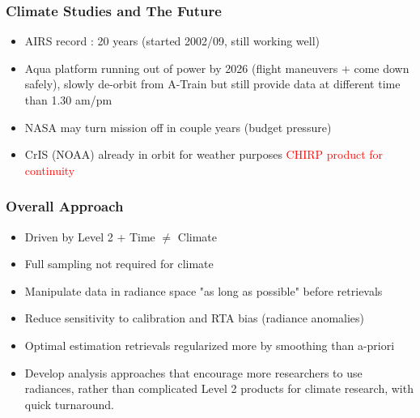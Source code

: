 \documentclass[10pt,t]{beamer}
\begin{document}
\begin{frame}
\frametitle{Climate Studies and The Future}  
\begin{itemize}
  \item AIRS record : 20 years (started 2002/09, still working well)  
  \item Aqua platform running out of power by 2026 (flight maneuvers + come down safely), slowly de-orbit from A-Train
        but still provide data at different time than 1.30 am/pm
  \item NASA may turn mission off in couple years (budget pressure)
  \item CrIS (NOAA) already in orbit for weather purposes \textcolor{red}{CHIRP product for continuity}
\end{itemize}
\end{frame}
\begin{frame}
\frametitle{Overall Approach}  
\begin{itemize}
\item Driven by Level 2 + Time \(\neq\) Climate
\item Full sampling not required for climate
\item Manipulate data in radiance space "as long as possible" before retrievals
\item Reduce sensitivity to calibration and RTA bias (radiance anomalies)
\item Optimal estimation retrievals regularized more by smoothing than a-priori
\item Develop analysis approaches that encourage more researchers to use radiances, rather than complicated Level 2 products for climate research, with quick turnaround.
\end{itemize}
\end{frame}
\end{document}
